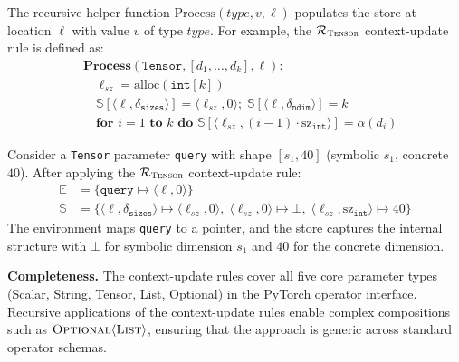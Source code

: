 The recursive helper function $\text{Process}(\mathit{type}, v, \ell)$ populates the store at location $\ell$ with value $v$ of type $\mathit{type}$.
For example, the $\mathcal{R}_{\textsc{Tensor}}$ context-update rule is defined as:
\begin{align*}
	 & \textbf{Process}(\texttt{Tensor}, [d_1, \dots, d_k], \ell):                                                                                              \\
	 & \quad \ell_{sz} = \text{alloc}(\texttt{int}[k])                                                                                                          \\
	 & \quad \mathbb{S}[\langle\ell, \delta_{\texttt{sizes}}\rangle] = \langle\ell_{sz}, 0\rangle;\; \mathbb{S}[\langle\ell, \delta_{\texttt{ndim}}\rangle] = k \\
	 & \quad \textbf{for } i = 1 \textbf{ to } k \textbf{ do } \mathbb{S}[\langle\ell_{sz}, (i{-}1) \cdot \text{sz}_{\texttt{int}}\rangle] = \alpha(d_i)
\end{align*}

\begin{example}
	Consider a \texttt{Tensor} parameter \texttt{query} with shape $[s_1, 40]$ (symbolic $s_1$, concrete $40$).
	After applying the $\mathcal{R}_{\textsc{Tensor}}$ context-update rule:
	\begin{align*}
		\mathbb{E} & = \{ \texttt{query} \mapsto \langle\ell, 0\rangle \}                                                                                                                                              \\
		\mathbb{S} & = \{ \langle\ell, \delta_{\texttt{sizes}}\rangle \mapsto \langle\ell_{sz}, 0\rangle,\; \langle\ell_{sz}, 0\rangle \mapsto \bot,\; \langle\ell_{sz}, \text{sz}_{\texttt{int}}\rangle \mapsto 40 \}
	\end{align*}
	The environment maps \texttt{query} to a pointer, and the store captures the internal structure with $\bot$ for symbolic dimension $s_1$ and $40$ for the concrete dimension.
\end{example}

\noindent\textbf{Completeness.}
The context-update rules cover all five core parameter types (Scalar, String, Tensor, List, Optional) in the PyTorch operator interface.
Recursive applications of the context-update rules enable complex compositions such as $\textsc{Optional}\langle\textsc{List}\rangle$, ensuring that the approach is generic across standard operator schemas.


